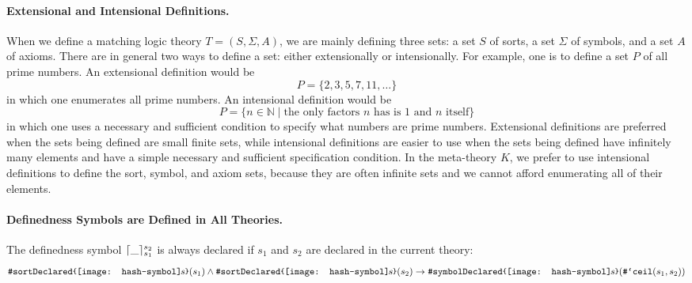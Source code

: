 \documentclass[UTF8,11pt]{article}
\theoremstyle{plain}
\theoremstyle{definition}
\theoremstyle{remark}
\DeclarePairedDelimiter{\ceil}{\lceil}{\rceil}
\newcommand{\parametric}[2]{{#1}\raisebox{.2ex}{\texttt{\footnotesize{\{}}}#2\raisebox{.2ex}{\texttt{\footnotesize{\}}}}}
\newcommand{\denote}[1]{\llbracket{#1}\rrbracket}
\newcommand{\shp}{\texttt{[image: hash-symbol]}\kern-0.1em}
\newcommand{\sharpsymbol}{\#}
\newcommand{\shs}{\shp s}
\newcommand{\Ksort}{\texttt{\sharpsymbol sort}}
\newcommand{\Ksymbol}{\texttt{\sharpsymbol symbol}}
\newcommand{\KSymbolceil}{\texttt{\sharpsymbol `ceil}}
\newcommand{\KsortDeclared}[1]{
  	\parametric{\texttt{\sharpsymbol sortDeclared}}{#1}}
\newcommand{\KsymbolDeclared}[1]{
  	\parametric{\texttt{\sharpsymbol symbolDeclared}}{#1}}
\newcommand{\KaxiomDeclared}{\texttt{\sharpsymbol axiomDeclared}}
\begin{document}
\paragraph{Extensional and Intensional Definitions.}
When we define a matching logic theory $T = (S, \Sigma, A)$, we are mainly 
defining three sets: a set $S$ of sorts, a set $\Sigma$ of symbols, and a set 
$A$ of axioms.
There are in general two ways to define a set: either extensionally or 
intensionally. 
For example, one is to define a set $P$ of all prime numbers. 
An extensional definition would be $$P = \{2, 3, 5, 7, 11, \dots\}$$
in which one enumerates all prime numbers.
An intensional definition would be $$P = \{ n \in \mathbb{N} \mid \text{the 
only factors $n$ has is 1 and $n$ itself} \}$$
in which one uses a necessary and sufficient condition to specify what numbers 
are prime numbers.
Extensional definitions are preferred when the sets being defined are small 
finite sets, while intensional definitions are easier to use when the sets 
being defined have infinitely many elements and have a simple necessary and 
sufficient specification condition.
In the meta-theory $K$, we prefer to use intensional definitions to define the 
sort, symbol, and axiom sets, because they are often infinite sets and we 
cannot afford enumerating all of their elements.

\paragraph{Definedness Symbols are Defined in All Theories.}
The definedness symbol $\ceil{\_}_{s_1}^{s_2}$ is always declared if $s_1$ and 
$s_2$ are declared in the current theory:
$$ \KsortDeclared{\shs}(s_1) \wedge 
\KsortDeclared{\shs}(s_2) \to 
\KsymbolDeclared{\shs}(\KSymbolceil(s_1, s_2))$$




%
%
\end{document}
